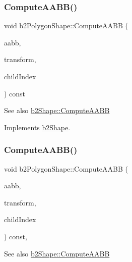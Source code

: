\subsubsection{\texorpdfstring{Compute\+A\+A\+B\+B()}{ComputeAABB()}\hspace{0.1cm}{\footnotesize\ttfamily [1/2]}}
{\footnotesize\ttfamily void b2\+Polygon\+Shape\+::\+Compute\+A\+A\+BB (\begin{DoxyParamCaption}\item[{\hyperlink{structb2AABB}{b2\+A\+A\+BB} $\ast$}]{aabb,  }\item[{const \hyperlink{structb2Transform}{b2\+Transform} \&}]{transform,  }\item[{int32}]{child\+Index }\end{DoxyParamCaption}) const\hspace{0.3cm}{\ttfamily [virtual]}}

\begin{DoxySeeAlso}{See also}
\hyperlink{classb2Shape_a88e9807fab0c8ca9a98d8926e50a1411}{b2\+Shape\+::\+Compute\+A\+A\+BB} 
\end{DoxySeeAlso}


Implements \hyperlink{classb2Shape_a88e9807fab0c8ca9a98d8926e50a1411}{b2\+Shape}.

\mbox{\label{classb2PolygonShape_ae9bcc185caf4a030003cefc4576e4717}} 
\subsubsection{\texorpdfstring{Compute\+A\+A\+B\+B()}{ComputeAABB()}\hspace{0.1cm}{\footnotesize\ttfamily [2/2]}}
{\footnotesize\ttfamily void b2\+Polygon\+Shape\+::\+Compute\+A\+A\+BB (\begin{DoxyParamCaption}\item[{\hyperlink{structb2AABB}{b2\+A\+A\+BB} $\ast$}]{aabb,  }\item[{const \hyperlink{structb2Transform}{b2\+Transform} \&}]{transform,  }\item[{int32}]{child\+Index }\end{DoxyParamCaption}) const\hspace{0.3cm}{\ttfamily [override]}, {\ttfamily [virtual]}}

\begin{DoxySeeAlso}{See also}
\hyperlink{classb2Shape_a88e9807fab0c8ca9a98d8926e50a1411}{b2\+Shape\+::\+Compute\+A\+A\+BB} 
\end{DoxySeeAlso}


